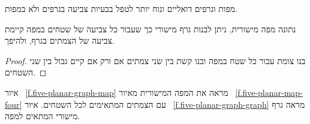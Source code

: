 %

מפות וגרפים דואליים ונוח יותר לטפל בבעיות צביעה בגרפים ולא במפות.
\begin{theorem}
נתונה מפה מישורית, ניתן לבנות גרף מישורי כך שעבור כל צביעה של שטחים במפה קיימת צביעה של הצמתים בגרף, ולהיפך.
\end{theorem}

\begin{proof}
בנו צומת עבור כל שטח במפה ובנו קשת בין שני צמתים אם ורק אם קיים גבול בין שני השטחים.
\end{proof}

\begin{example}
איור%
~\ref{f.five-planar-graph-map}
מראה את המפה המישורית מאיור%
~\ref{f.five-planar-map-four}
עם הצמתים המתאימים לכל השטחים. איור%
~\ref{f.five-planar-graph-graph}
מראה גרף מישורי המתאים למפה.
\end{example}

